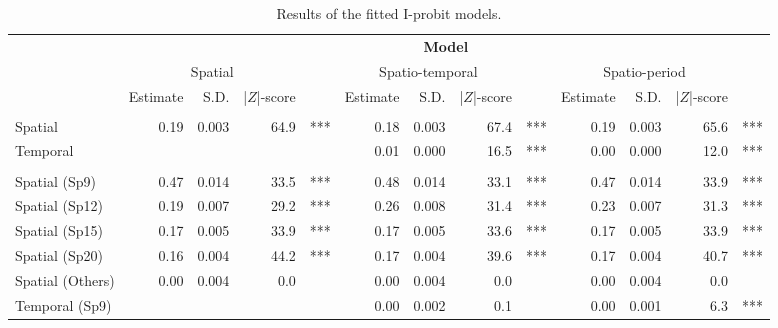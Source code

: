 \documentclass[a4paper,showframe,11pt]{report}\usepackage[]{graphicx}\usepackage[]{color}
\begin{document}
\begin{landscape}\begin{table}

\caption{\label{tab:table.btb}Results of the fitted I-probit models.}
\centering
\begin{tabular}[t]{lrrrlrrrlrrrl}
\toprule
\multicolumn{ 1}{c}{\bfseries  } & \multicolumn{12}{c}{\bfseries Model} \\
\cmidrule(l{2pt}r{2pt}){2-13}
\multicolumn{1}{c}{ } & \multicolumn{3}{c}{Spatial} & \multicolumn{1}{c}{ } & \multicolumn{3}{c}{Spatio-temporal} & \multicolumn{1}{c}{ } & \multicolumn{3}{c}{Spatio-period} \\
\cmidrule(l{2pt}r{2pt}){2-4} \cmidrule(l{2pt}r{2pt}){6-8} \cmidrule(l{2pt}r{2pt}){10-12}
  & Estimate & S.D. & |$Z$|-score &  & Estimate & S.D. & |$Z$|-score &  & Estimate & S.D. & |$Z$|-score & \\
\midrule
\addlinespace[0.5em]
\multicolumn{13}{l}{\textbf{Shared scale model}}\\
\hspace{1em}Spatial & 0.19 & 0.003 & 64.9 & *** & 0.18 & 0.003 & 67.4 & *** & 0.19 & 0.003 & 65.6 & ***\\
\hspace{1em}Temporal &  &  &  &  & 0.01 & 0.000 & 16.5 & *** & 0.00 & 0.000 & 12.0 & ***\\
\addlinespace[0.5em]
\multicolumn{13}{l}{\textbf{Separate scale model}}\\
\hspace{1em}Spatial (Sp9) & 0.47 & 0.014 & 33.5 & *** & 0.48 & 0.014 & 33.1 & *** & 0.47 & 0.014 & 33.9 & ***\\
\hspace{1em}Spatial (Sp12) & 0.19 & 0.007 & 29.2 & *** & 0.26 & 0.008 & 31.4 & *** & 0.23 & 0.007 & 31.3 & ***\\
\hspace{1em}Spatial (Sp15) & 0.17 & 0.005 & 33.9 & *** & 0.17 & 0.005 & 33.6 & *** & 0.17 & 0.005 & 33.9 & ***\\
\hspace{1em}Spatial (Sp20) & 0.16 & 0.004 & 44.2 & *** & 0.17 & 0.004 & 39.6 & *** & 0.17 & 0.004 & 40.7 & ***\\
\hspace{1em}Spatial (Others) & 0.00 & 0.004 & 0.0 &  & 0.00 & 0.004 & 0.0 &  & 0.00 & 0.004 & 0.0 & \\
\hspace{1em}Temporal (Sp9) &  &  &  &  & 0.00 & 0.002 & 0.1 &  & 0.00 & 0.001 & 6.3 & ***\\

\end{tabular}
\end{table}
\end{landscape}
\end{document}
